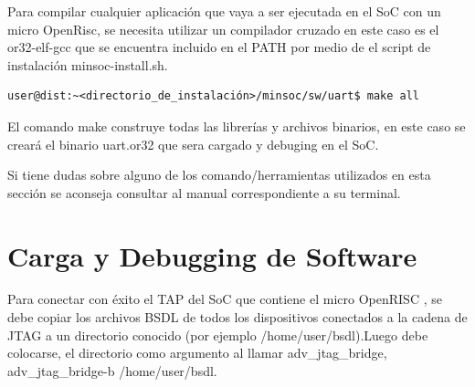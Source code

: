 Para compilar cualquier aplicación que vaya a ser ejecutada en el SoC con un micro OpenRisc, se necesita utilizar un compilador cruzado en este caso es el or32-elf-gcc que se encuentra incluido en el PATH por medio de el script de instalación minsoc-install.sh.

\begin{lstlisting}[breaklines]
user@dist:~<directorio_de_instalación>/minsoc/sw/uart$ make all
\end{lstlisting}
 
El comando make construye todas las librerías y archivos binarios, en este caso se creará el binario uart.or32 que sera cargado y debuging en el SoC.
 

Si tiene dudas sobre alguno de los comando/herramientas utilizados en esta sección se aconseja consultar al manual correspondiente a su terminal.


\section{Carga y Debugging de Software}


Para conectar con éxito el TAP del SoC que contiene el micro OpenRISC , se debe copiar los archivos BSDL de todos los dispositivos conectados a la cadena de JTAG a un directorio conocido (por ejemplo /home/user/bsdl).Luego debe colocarse, el directorio como argumento al llamar adv\_jtag\_bridge, adv\_jtag\_bridge-b /home/user/bsdl.


